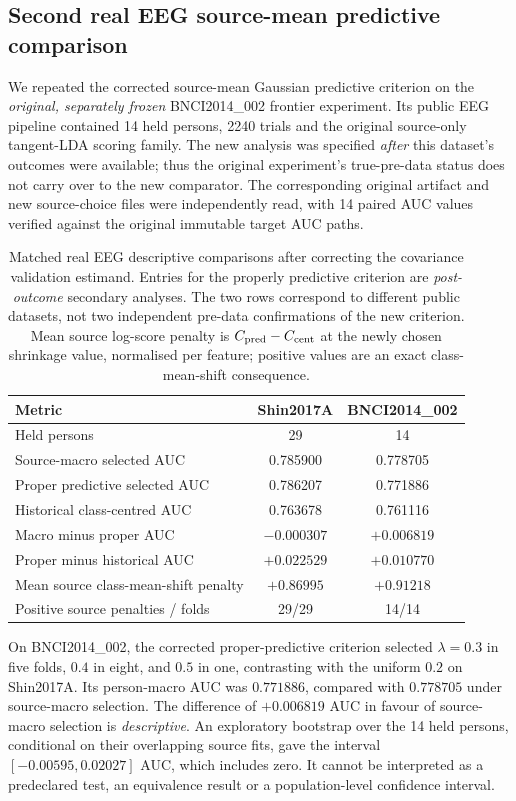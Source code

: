 \subsection{Second real EEG source-mean predictive comparison}
\label{sec:v18-bnci-proper}
We repeated the corrected source-mean Gaussian predictive
criterion on the \emph{original, separately frozen}
BNCI2014\_002 frontier experiment. Its public EEG pipeline
contained 14 held persons, 2240 trials and the original
source-only tangent-LDA scoring family. The new analysis
was specified \emph{after} this dataset's outcomes were
available; thus the original experiment's true-pre-data
status does not carry over to the new comparator.
The corresponding original artifact and new source-choice
files were independently read, with 14 paired AUC values
verified against the original immutable target AUC paths.

\begin{table}[tb]
\centering
\small
\caption{Matched real EEG descriptive comparisons after
correcting the covariance validation estimand. Entries
for the properly predictive criterion are \emph{post-outcome}
secondary analyses. The two rows correspond to different
public datasets, not two independent pre-data confirmations
of the new criterion. Mean source log-score penalty is
\(C_{\rm pred}-C_{\rm cent}\) at the newly chosen shrinkage
value, normalised per feature; positive values are an
exact class-mean-shift consequence.}
\label{tab:v18-two-real-cohorts}
\begin{tabular}{lcc}
\toprule
Metric & Shin2017A & BNCI2014\_002\\
\midrule
Held persons & 29 & 14\\
Source-macro selected AUC & 0.785900 & 0.778705\\
Proper predictive selected AUC & 0.786207 & 0.771886\\
Historical class-centred AUC & 0.763678 & 0.761116\\
Macro minus proper AUC & $-0.000307$ & $+0.006819$\\
Proper minus historical AUC & $+0.022529$ & $+0.010770$\\
Mean source class-mean-shift penalty & $+0.86995$ & $+0.91218$\\
Positive source penalties / folds & 29/29 & 14/14\\
\bottomrule
\end{tabular}
\end{table}

On BNCI2014\_002, the corrected proper-predictive
criterion selected \(\lambda=0.3\) in five folds,
\(0.4\) in eight, and \(0.5\) in one, contrasting
with the uniform \(0.2\) on Shin2017A.
Its person-macro AUC was \(0.771886\), compared
with \(0.778705\) under source-macro selection.
The difference of \(+0.006819\) AUC in favour
of source-macro selection is \emph{descriptive}.
An exploratory bootstrap over the 14 held persons,
conditional on their overlapping source fits,
gave the interval \([-0.00595,0.02027]\) AUC,
which includes zero. It cannot be interpreted
as a predeclared test, an equivalence result or
a population-level confidence interval.

